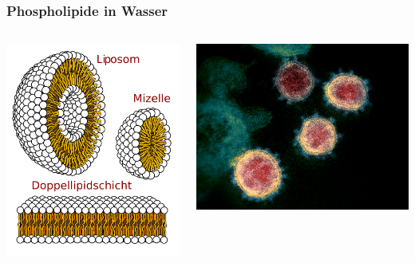 \documentclass{beamer}
\begin{document}

\begin{frame}
\frametitle{Phospholipide in Wasser}

\begin{columns}[c]
\begin{column}{5cm}
\includegraphics[width=\textwidth]{Phospholipide_in_Wasser.png}
\end{column}

\pause

\begin{column}{5cm}
\includegraphics[width=\textwidth]{SARS-CoV-2.jpg}
\end{column}


\end{columns}
\end{frame}
\end{document}
